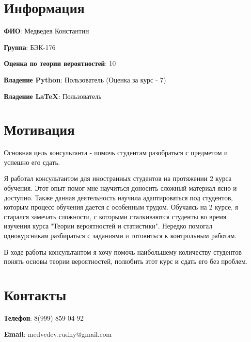 \documentclass[a4paper, 12pt]{article}
\begin{document}
\section{Информация}
\begin{flushleft}
	
\textbf{ФИО}: Медведев Константин

\textbf{Группа}: БЭК-176

\textbf{Оценка по теории вероятностей}: 10

\textbf{Владение Python}: Пользователь (Оценка за курс - 7)

\textbf{Владение LaTeX}: Пользователь 
\end{flushleft}
\section{Мотивация}

Основная цель консультанта - помочь студентам разобраться с предметом и успешно его сдать. 

Я работал консультантом для иностранных студентов на протяжении 2 курса обучения. Этот опыт помог мне научиться доносить сложный материал ясно и доступно. Также данная деятельность научила адаптироваться под студентов, которым процесс обучения дается с особенным трудом. Обучаясь на 2 курсе, я старался замечать сложности, с которыми сталкиваются студенты во время изучения курса "Теории вероятностей и статистики". Нередко помогал однокурсникам разбираться с заданиями и готовиться к контрольным работам.

В ходе работы консультантом я хочу помочь наибольшему количеству студентов понять основы теории вероятностей, полюбить этот курс и сдать его без проблем. 

\section{Контакты}
\begin{flushleft}
\textbf{Телефон}: 8(999)-859-04-92

\textbf{Email}: medvedev.rudny@gmail.com
\end{flushleft}
\end{document}
